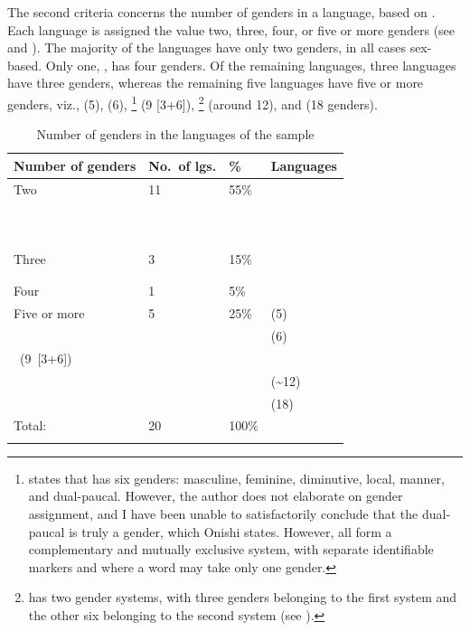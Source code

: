 \documentclass[output=collectionpaper]{langsci/langscibook}
\begin{document}
The second criteria concerns the number of genders in a language, based on \citet{Corbett2013}. Each language is assigned the value two, three, four, or five or more genders (see  and ).
The majority of the languages have only two genders, in all cases sex-based. Only one, , has four genders. Of the remaining languages, three languages have three genders, whereas the remaining five languages have five or more genders, viz.,  (5),  (6),%
\footnote{\citet{Onishi1994} states that  has six genders: masculine, feminine, diminutive, local, manner, and dual-paucal. However, the author does not elaborate on gender assignment, and I have been unable to satisfactorily conclude that the dual-paucal is truly a gender, which Onishi states. However, all form a complementary and mutually exclusive system, with separate identifiable markers and where a word may take only one gender.
} %
 (9 [3+6]),%
\footnote{%
 has two gender systems, with three genders belonging to the first system and the other six belonging to the second system (see ).} %
 (around 12), and  (18 genders).


\begin{table}[p]
\small
\begin{tabularx}{\textwidth}{lYYl}
\lsptoprule

Number of genders & No.\ of lgs. & \% & Languages\\
\midrule
Two & 11 & 55\% & {}\\
&&&{}                  \\
&&&{}               \\
&&&{}               \\
&&&{}                 \\
&&&{}              \\
&&&{}                  \\
&&&{}                 \\
&&&{}                  \\
&&&{}                \\
&&&\\
Three & 3 & 15\% & {}\\
&&&{}\\
&&&\\
Four & 1 & 5\% & \\
Five or more & 5 & 25\% & { (5)}  \\
&&&{ (6)}\\
{\mbox{ (9 [3+6])}}\\
&&&{ ({\textasciitilde}12)}\\
&&& (18)\\
\midrule
Total: & 20 & 100\% & \\
\lspbottomrule
\end{tabularx}
\caption{Number of genders in the languages of the sample}
\label{tab:Svard:3}
\end{table}
\end{document}
